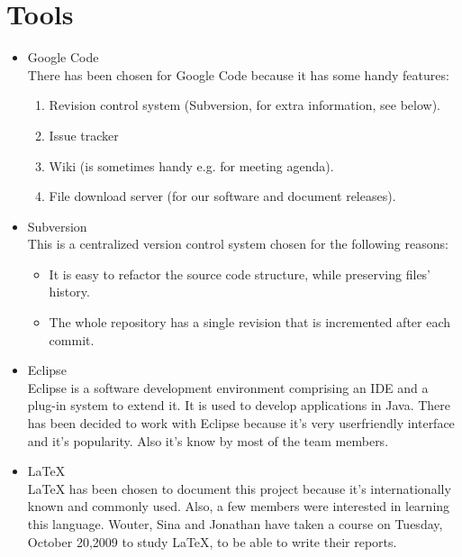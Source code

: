 \documentclass[a4paper, 12pt]{article}
\begin{document}
	\section{Tools}
	\begin{itemize}
	\item {Google Code} \\
	There has been chosen for Google Code because it has some handy features:
	\begin{enumerate}
 		\item Revision control system (Subversion, for extra information, see below).
		\item Issue tracker
		\item Wiki (is sometimes handy e.g. for meeting agenda).
		\item File download server (for our software and document releases).
	\end{enumerate}
	
	\item Subversion\\
	This is a centralized version control system chosen for the following reasons:
		\begin{itemize}
	\item It is easy to refactor the source code structure, while preserving files' history.
	\item The whole repository has a single revision that is incremented after each commit.

		\end{itemize}

	\item Eclipse\\
	Eclipse is a software development environment comprising an IDE and a plug-in system to extend it. It is used to develop applications in Java. \cite{site3}
	There has been decided to work with Eclipse because it's very userfriendly interface and it's popularity. Also it's know by most of the team members.
	\item \LaTeX{}\\
	 \LaTeX{} has been chosen to document this project because it's internationally known and commonly used. Also, a few members were interested in learning this 			language. Wouter, Sina and Jonathan have taken a course on Tuesday, October 20,2009 to study \LaTeX{}, to be able to write their reports.

	\end{itemize}
\end{document}

